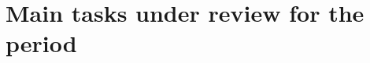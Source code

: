 \documentclass{beamer}
\begin{document}




\section{Main tasks under review for the period}
\end{document}
